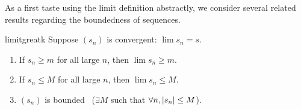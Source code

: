 



As a first taste using the limit definition abstractly, we consider several related results regarding the boundedness of sequences.


\begin{thm}{}{limitgreatk}
	Suppose $(s_n)$ is convergent: $\lim s_n=s$.
 	\begin{enumerate}\itemsep0pt
 	  \item If $s_n\ge m$ for all large\footnotemark{} $n$, then $\lim s_n\ge m$.
 	  \item If $s_n\le M$ for all large $n$, then $\lim s_n\le M$.
 	  \item $(s_n)$ is bounded \ ($\exists M$ such that $\forall n, \left| s_n\right|\le M$).
 	\end{enumerate} 
\end{thm}


